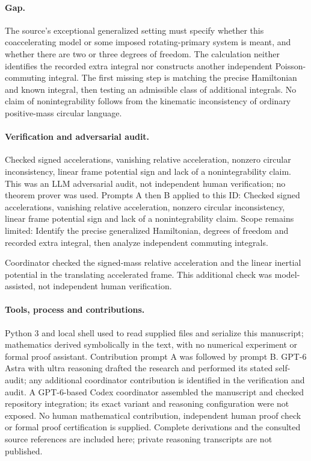 \documentclass[11pt]{article}
\begin{document}
\paragraph{Gap.}The source's exceptional generalized setting must specify whether this coaccelerating model or some imposed rotating-primary system is meant, and whether there are two or three degrees of freedom. The calculation neither identifies the recorded extra integral nor constructs another independent Poisson-commuting integral. The first missing step is matching the precise Hamiltonian and known integral, then testing an admissible class of additional integrals. No claim of nonintegrability follows from the kinematic inconsistency of ordinary positive-mass circular language.

\paragraph{Verification and adversarial audit.}
Checked signed accelerations, vanishing relative acceleration, nonzero circular inconsistency, linear frame potential sign and lack of a nonintegrability claim. This was an LLM adversarial audit, not independent human verification; no theorem prover was used. Prompts A then B applied to this ID: Checked signed accelerations, vanishing relative acceleration, nonzero circular inconsistency, linear frame potential sign and lack of a nonintegrability claim. Scope remains limited: Identify the precise generalized Hamiltonian, degrees of freedom and recorded extra integral, then analyze independent commuting integrals.

Coordinator checked the signed-mass relative acceleration and the linear inertial potential in the translating accelerated frame. This additional check was model-assisted, not independent human verification.

\paragraph{Tools, process and contributions.}
Python 3 and local shell used to read supplied files and serialize this manuscript; mathematics derived symbolically in the text, with no numerical experiment or formal proof assistant. Contribution prompt A was followed by prompt B. GPT-6 Astra with ultra reasoning drafted the research and performed its stated self-audit; any additional coordinator contribution is identified in the verification and audit. A GPT-6-based Codex coordinator assembled the manuscript and checked repository integration; its exact variant and reasoning configuration were not exposed. No human mathematical contribution, independent human proof check or formal proof certification is supplied. Complete derivations and the consulted source references are included here; private reasoning transcripts are not published.
\end{document}
